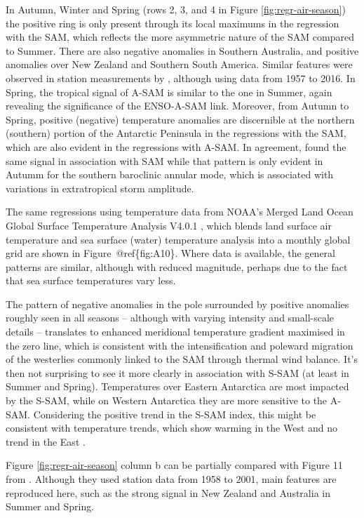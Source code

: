 \documentclass[smallextended]{svjour3}       %
\begin{document}
In Autumn, Winter and Spring (rows 2, 3, and 4 in Figure \ref{fig:regr-air-season}) the positive ring is only present through its local maximums in the regression with the SAM, which reflects the more asymmetric nature of the SAM compared to Summer.
There are also negative anomalies in Southern Australia, and positive anomalies over New Zealand and Southern South America.
Similar features were observed in station measurements by \citet{jones2019}, although using data from 1957 to 2016.
In Spring, the tropical signal of A\nobreakdash-SAM is similar to the one in Summer, again revealing the significance of the ENSO-A\nobreakdash-SAM link.
Moreover, from Autumn to Spring, positive (negative) temperature anomalies are discernible at the northern (southern) portion of the Antarctic Peninsula in the regressions with the SAM, which are also evident in the regressions with A-SAM. In agreement, \citet{marshall2016} found the same signal in association with SAM while that pattern is only evident in Autumm for the southern baroclinic annular mode, which is associated with variations in extratropical storm amplitude.

The same regressions using temperature data from NOAA's Merged Land Ocean Global Surface Temperature Analysis V4.0.1 \citep{smith2008, vose2012}, which blends land surface air temperature and sea surface (water) temperature analysis into a monthly global grid are shown in Figure~@ref\{fig:A10\}.
Where data is available, the general patterns are similar, although with reduced magnitude, perhaps due to the fact that sea surface temperatures vary less.

The pattern of negative anomalies in the pole surrounded by positive anomalies roughly seen in all seasons -- although with varying intensity and small-scale details -- translates to enhanced meridional temperature gradient maximised in the zero line, which is consistent with the intensification and poleward migration of the westerlies commonly linked to the SAM through thermal wind balance.
It's then not surprising to see it more clearly in association with S\nobreakdash-SAM (at least in Summer and Spring).
Temperatures over Eastern Antarctica are most impacted by the S\nobreakdash-SAM, while on Western Antarctica they are more sensitive to the A\nobreakdash-SAM.
Considering the positive trend in the S\nobreakdash-SAM index, this might be consistent with temperature trends, which show warming in the West and no trend in the East \citep{nicolas2014}.

Figure \ref{fig:regr-air-season} column b can be partially compared with Figure 11 from \citet{fogt2012}.
Although they used station data from 1958 to 2001, main features are reproduced here, such as the strong signal in New Zealand and Australia in Summer and Spring.
\end{document}
